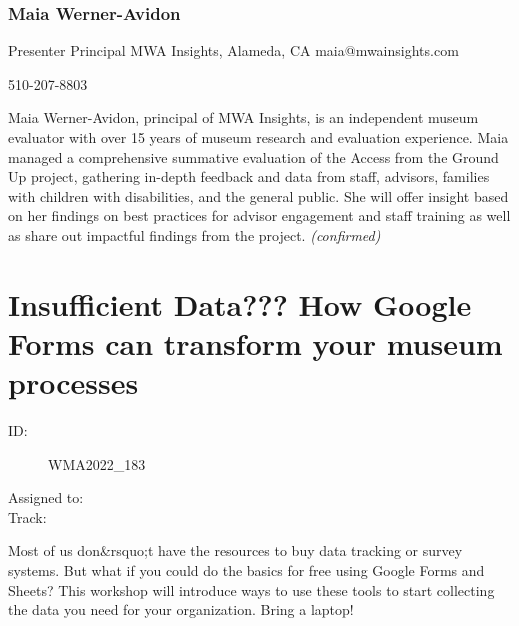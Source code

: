 \documentclass{report}
\begin{document}
              
                \subsubsection*{ Maia  Werner-Avidon }
                Presenter\newline
                Principal\newline
                MWA Insights, Alameda, CA
                \newline
                maia@mwainsights.com\newline
                
                510-207-8803\newline

                Maia Werner-Avidon, principal of MWA Insights, is an independent museum evaluator with over 15 years of museum research and evaluation experience. Maia managed a comprehensive summative evaluation of the Access from the Ground Up project, gathering in-depth feedback and data from staff, advisors, families with children with disabilities, and the general public. She will offer insight based on her findings on best practices for advisor engagement and staff training as well as share out impactful findings from the project.
                \emph{ (confirmed) }
              

              

              
        
          \newpage
          \section{ Insufficient Data??? How Google Forms can transform your museum processes }
            \begin{description}
              \item [ID:]
              WMA2022\_183

              \item [Assigned to:]
                \item [Track:]
              \end{description}

              Most of us don\&rsquo;t have the resources to buy data tracking or survey systems. But what if you could do the basics for free using Google Forms and Sheets? This workshop will introduce ways to use these tools to start collecting the data you need for your organization. Bring a laptop!
\end{document}
